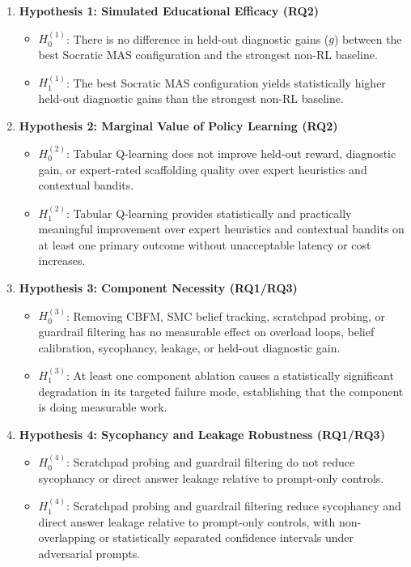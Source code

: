 \documentclass[11pt,a4paper]{report}
\begin{document}
\begin{enumerate}
    \item \textbf{Hypothesis 1: Simulated Educational Efficacy (RQ2)}
    \begin{itemize}
        \item $H_0^{(1)}$: There is no difference in held-out diagnostic gains ($g$) between the best Socratic MAS configuration and the strongest non-RL baseline.
        \item $H_1^{(1)}$: The best Socratic MAS configuration yields statistically higher held-out diagnostic gains than the strongest non-RL baseline.
    \end{itemize}
    
    \item \textbf{Hypothesis 2: Marginal Value of Policy Learning (RQ2)}
    \begin{itemize}
        \item $H_0^{(2)}$: Tabular Q-learning does not improve held-out reward, diagnostic gain, or expert-rated scaffolding quality over expert heuristics and contextual bandits.
        \item $H_1^{(2)}$: Tabular Q-learning provides statistically and practically meaningful improvement over expert heuristics and contextual bandits on at least one primary outcome without unacceptable latency or cost increases.
    \end{itemize}
    
    \item \textbf{Hypothesis 3: Component Necessity (RQ1/RQ3)}
    \begin{itemize}
        \item $H_0^{(3)}$: Removing CBFM, SMC belief tracking, scratchpad probing, or guardrail filtering has no measurable effect on overload loops, belief calibration, sycophancy, leakage, or held-out diagnostic gain.
        \item $H_1^{(3)}$: At least one component ablation causes a statistically significant degradation in its targeted failure mode, establishing that the component is doing measurable work.
    \end{itemize}

    \item \textbf{Hypothesis 4: Sycophancy and Leakage Robustness (RQ1/RQ3)}
    \begin{itemize}
        \item $H_0^{(4)}$: Scratchpad probing and guardrail filtering do not reduce sycophancy or direct answer leakage relative to prompt-only controls.
        \item $H_1^{(4)}$: Scratchpad probing and guardrail filtering reduce sycophancy and direct answer leakage relative to prompt-only controls, with non-overlapping or statistically separated confidence intervals under adversarial prompts.
    \end{itemize}
\end{enumerate}
\end{document}
